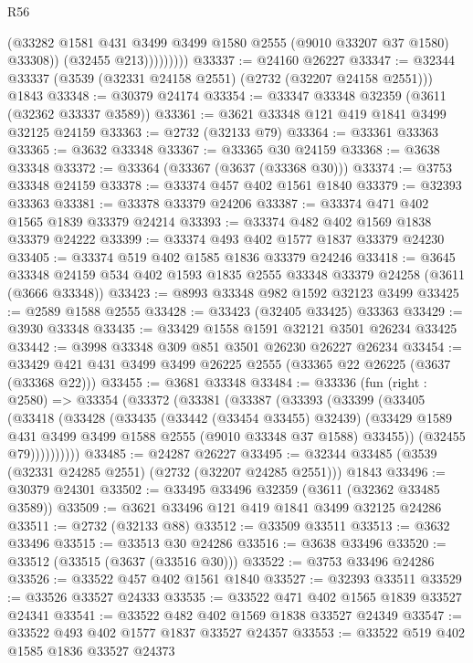 \begin{lexlean}{R56}
\begin{coremodule}
                      (@33282 @1581 @431 @3499 @3499 @1580 @2555 (@9010 @33207 @37 @1580) @33308))
                    (@32455 @213)))))))))
@33337 := @24160 @26227
@33347 := @32344 @33337 (@3539 (@32331 @24158 @2551) (@2732 (@32207 @24158 @2551))) @1843
@33348 := @30379 @24174
@33354 := @33347 @33348 @32359 (@3611 (@32362 @33337 @3589))
@33361 := @3621 @33348 @121 @419 @1841 @3499 @32125 @24159
@33363 := @2732 (@32133 @79)
@33364 := @33361 @33363
@33365 := @3632 @33348
@33367 := @33365 @30 @24159
@33368 := @3638 @33348
@33372 := @33364 (@33367 (@3637 (@33368 @30)))
@33374 := @3753 @33348 @24159
@33378 := @33374 @457 @402 @1561 @1840
@33379 := @32393 @33363
@33381 := @33378 @33379 @24206
@33387 := @33374 @471 @402 @1565 @1839 @33379 @24214
@33393 := @33374 @482 @402 @1569 @1838 @33379 @24222
@33399 := @33374 @493 @402 @1577 @1837 @33379 @24230
@33405 := @33374 @519 @402 @1585 @1836 @33379 @24246
@33418 := @3645
    @33348
    @24159
    @534
    @402
    @1593
    @1835
    @2555
    @33348
    @33379
    @24258
    (@3611 (@3666 @33348))
@33423 := @8993 @33348 @982 @1592 @32123 @3499
@33425 := @2589 @1588 @2555
@33428 := @33423 (@32405 @33425) @33363
@33429 := @3930 @33348
@33435 := @33429 @1558 @1591 @32121 @3501 @26234 @33425
@33442 := @3998 @33348 @309 @851 @3501 @26230 @26227 @26234
@33454 := @33429 @421 @431 @3499 @3499 @26225 @2555 (@33365 @22 @26225 (@3637 (@33368 @22)))
@33455 := @3681 @33348
@33484 := @33336
    (fun (right : @2580) =>
    @33354
      (@33372
        (@33381
          (@33387
            (@33393
              (@33399
                (@33405
                  (@33418
                    (@33428
                      (@33435
                        (@33442 (@33454 @33455) @32439)
                        (@33429 @1589 @431 @3499 @3499 @1588 @2555 (@9010 @33348 @37 @1588) @33455))
                      (@32455 @79))))))))))
@33485 := @24287 @26227
@33495 := @32344 @33485 (@3539 (@32331 @24285 @2551) (@2732 (@32207 @24285 @2551))) @1843
@33496 := @30379 @24301
@33502 := @33495 @33496 @32359 (@3611 (@32362 @33485 @3589))
@33509 := @3621 @33496 @121 @419 @1841 @3499 @32125 @24286
@33511 := @2732 (@32133 @88)
@33512 := @33509 @33511
@33513 := @3632 @33496
@33515 := @33513 @30 @24286
@33516 := @3638 @33496
@33520 := @33512 (@33515 (@3637 (@33516 @30)))
@33522 := @3753 @33496 @24286
@33526 := @33522 @457 @402 @1561 @1840
@33527 := @32393 @33511
@33529 := @33526 @33527 @24333
@33535 := @33522 @471 @402 @1565 @1839 @33527 @24341
@33541 := @33522 @482 @402 @1569 @1838 @33527 @24349
@33547 := @33522 @493 @402 @1577 @1837 @33527 @24357
@33553 := @33522 @519 @402 @1585 @1836 @33527 @24373

\end{coremodule}
\end{lexlean}
